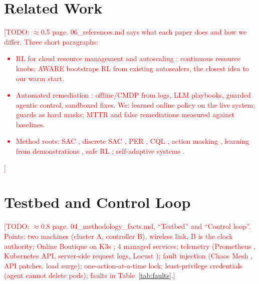 \documentclass[conference,10pt]{IEEEtran}
\newcommand{\todo}[1]{\textcolor{red}{[TODO: #1]}}
\begin{document}
\section{Related Work}\label{sec:related}
\todo{$\approx$0.5 page. 06\_references.md says what each paper does and how we differ. Three short paragraphs:
\begin{itemize}
\item RL for cloud resource management and autoscaling \cite{qiu2020firm,zhang2021sinan,qiu2023aware}: continuous resource knobs; AWARE bootstraps RL from existing autoscalers, the closest idea to our warm start.
\item Automated remediation \cite{dai2026saferemediation,zhang2026e2ereme,habibi2026arbiter,cai2026guardedact}: offline/CMDP from logs, LLM playbooks, guarded agentic control, sandboxed fixes. We: learned online policy on the live system; guards as hard masks; MTTR and false remediations measured against baselines.
\item Method roots: SAC \cite{haarnoja2018sac}, discrete SAC \cite{christodoulou2019sacd}, PER \cite{schaul2016per}, CQL \cite{kumar2020cql}, action masking \cite{huang2022masking}, learning from demonstrations \cite{hester2018dqfd,nair2020awac}, safe RL \cite{garcia2015saferl}; self-adaptive systems \cite{kephart2003vision}.
\end{itemize}}

\section{Testbed and Control Loop}\label{sec:testbed}
\todo{$\approx$0.8 page. 04\_methodology\_facts.md, ``Testbed'' and ``Control loop''. Points:
two machines (cluster A, controller B), wireless link, B is the clock authority; Online Boutique \cite{onlineboutique} on K3s \cite{k3s}; 4 managed services; telemetry (Prometheus \cite{prometheus}, Kubernetes API, server-side request logs, Locust \cite{locust}); fault injection (Chaos Mesh \cite{chaosmesh}, API patches, load surge); one-action-at-a-time lock; least-privilege credentials (agent cannot delete pods); faults in Table~\ref{tab:faults}.}
\end{document}

